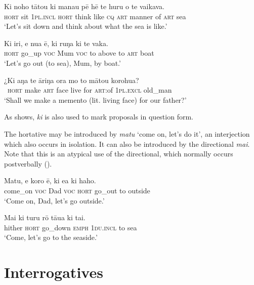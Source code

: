 \ea\label{ex:10.12}
\gll Ki noho tātou ki mana{\ꞌ}u pē hē te huru o te vaikava. \\
\textsc{hort} sit \textsc{1pl.incl} \textsc{hort} think like \textsc{cq} \textsc{art} manner of \textsc{art} sea \\

\glt 
‘Let’s sit down and think about what the sea is like.’ \textstyleExampleref{[R334.173]} 
\z

\ea\label{ex:10.13}
\gll Ki iri, e nua ē, ki ruŋa ki te vaka. \\
\textsc{hort} go\_up \textsc{voc} Mum \textsc{voc} to above to \textsc{art} boat \\

\glt 
‘Let’s go out (to sea), Mum, by boat.’ \textstyleExampleref{[R368.024]} 
\z

\ea\label{ex:10.14}
\gll ¿Ki aŋa te {\ꞌ}āriŋa ora mo to mātou korohu{\ꞌ}a? \\
~\textsc{hort} make \textsc{art} face live for \textsc{art}:of \textsc{1pl.excl} old\_man \\

\glt
‘Shall we make a memento (lit. living face) for our father?’ \textstyleExampleref{[Ley-4-06.004]}
\z

As  shows, \textit{ki} is also used to mark proposals in question form.

The hortative may be introduced by \textit{matu} ‘come on, let’s do it’, an interjection which also occurs in isolation. It can also be introduced by the directional \textit{mai}. Note that this is an atypical use of the directional, which normally occurs postverbally ().

\ea\label{ex:10.15}
\gll Matu, e koro ē, ki e{\ꞌ}a ki haho. \\
come\_on \textsc{voc} Dad \textsc{voc} \textsc{hort} go\_out to outside \\

\glt 
‘Come on, Dad, let’s go outside.’ \textstyleExampleref{[R229.107]} 
\z

\ea\label{ex:10.16}
\gll Mai ki turu rō tāua ki tai. \\
hither \textsc{hort} go\_down \textsc{emph} \textsc{1du.incl} to sea \\

\glt 
‘Come, let’s go to the seaside.’ \textstyleExampleref{[R245.112]}\textstyleExampleref{} 
\z
{}

\section{Interrogatives}\label{sec:10.3}
